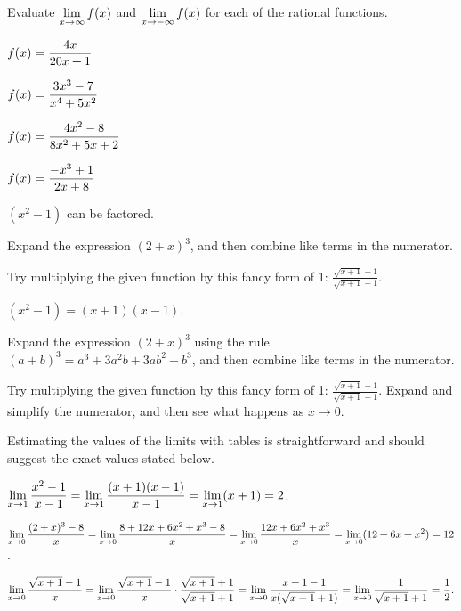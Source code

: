 \begin{activity} \label{A:1.2.2}  Evaluate $\displaystyle \lim_{x \to \infty} f(x)$ and $\displaystyle \lim_{x \to -\infty} f(x)$ for each of the rational functions.  
\begin{multicols}{2}
\ba
\item $\displaystyle f(x) = \frac{4x}{20x+1}$
	
\item $\displaystyle f(x) = \frac{3x^3 - 7}{x^4 + 5x^2}$
	
\item $\displaystyle f(x) = \frac{4x^2 - 8}{8x^2 + 5x + 2}$

\item $\displaystyle f(x) = \frac{-x^3 + 1}{2x + 8}$
\ea
\end{multicols}
\end{activity}
\begin{smallhint}
\ba
	\item $(x^2 - 1)$ can be factored.
	\item Expand the expression $(2+x)^3$, and then combine like terms in the numerator.
	\item Try multiplying the given function by this fancy form of 1: $\frac{\sqrt{x+1} + 1}{\sqrt{x+1} + 1}$.
\ea
\end{smallhint}
\begin{bighint}
\ba
	\item $(x^2 - 1) = (x+1)(x-1)$.
	\item Expand the expression $(2+x)^3$ using the rule $(a+b)^3 = a^3 + 3a^2b + 3ab^2 + b^3$, and then combine like terms in the numerator.
	\item Try multiplying the given function by this fancy form of 1: $\frac{\sqrt{x+1} + 1}{\sqrt{x+1} + 1}$.  Expand and simplify the numerator, and then see what happens as $x \to 0$.
\ea
\end{bighint}
\begin{activitySolution}
Estimating the values of the limits with tables is straightforward and should suggest the exact values stated below.
\ba
	\item $\displaystyle \lim_{x \to 1} \frac{x^2 - 1}{x-1} = \lim_{x \to 1} \frac{(x+1)(x-1)}{x-1} = \lim_{x \to 1} (x+1) = 2$. 
	\item $\displaystyle \lim_{x \to 0} \frac{(2+x)^3 - 8}{x} = \lim_{x \to 0} \frac{8 + 12x + 6x^2 + x^3 - 8}{x} = \lim_{x \to 0} \frac{12x + 6x^2 + x^3}{x} =  \lim_{x \to 0} (12 + 6x + x^2) = 12$.
	\item $\displaystyle \lim_{x \to 0} \frac{\sqrt{x+1} - 1}{x} = \lim_{x \to 0} \frac{\sqrt{x+1} - 1}{x} \cdot \frac{\sqrt{x+1} + 1}{\sqrt{x+1} + 1} = \lim_{x \to 0} \frac{x+1-1}{x(\sqrt{x+1}+1)} = \lim_{x \to 0} \frac{1}{\sqrt{x+1}+1} = \frac{1}{2}.$
\ea
\end{activitySolution}
\aftera
